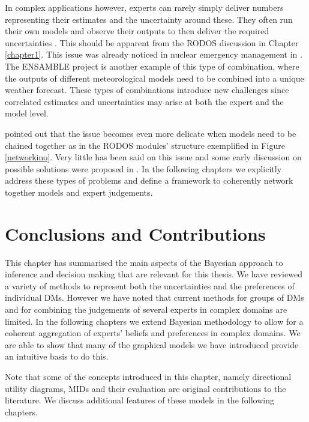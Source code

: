 In complex applications however, experts can rarely simply  deliver  numbers representing their estimates and the uncertainty around these. They often run their own models and observe their outputs to then deliver the required uncertainties \citep{French2011}. This should be apparent from the RODOS discussion in Chapter \ref{chapter1}. This issue was already noticed in nuclear emergency management in \citet{Cooke2000}. The ENSAMBLE project \citep{Krishnamurti2000,Mikkelsen2003} is another example of this type of combination, where the outputs of different meteorological models need to be combined into a unique weather forecast. These types of combinations introduce new challenges since correlated estimates and uncertainties may arise at both  the expert and the model level. 

\citet{French2011} pointed out that the issue becomes even more delicate when models need to be chained together as in the RODOS modules' structure exemplified in Figure \ref{networkino}. Very little has been said on this issue and some early discussion on possible solutions were proposed in \citet{French1991}.  In the following chapters we explicitly address these types of problems and define a framework to coherently network together models and expert judgements.
 
\section{Conclusions and Contributions}
This chapter has summarised the main aspects of the Bayesian approach to inference and decision making that are relevant for this thesis. We have reviewed a variety of methods to represent both the uncertainties and the preferences of individual DMs. However we have noted that current methods for groups of DMs and for combining the judgements of several experts in complex domains are limited. In the following chapters we extend  Bayesian methodology to allow for a coherent aggregation of experts' beliefs and preferences in complex domains. We are able to show that many of the graphical models we have introduced provide an intuitive basis to do this. 

Note that some of the concepts introduced in this chapter, namely directional utility diagrams, MIDs and their evaluation are original contributions to the literature. We discuss additional features of these models in the following chapters. 

